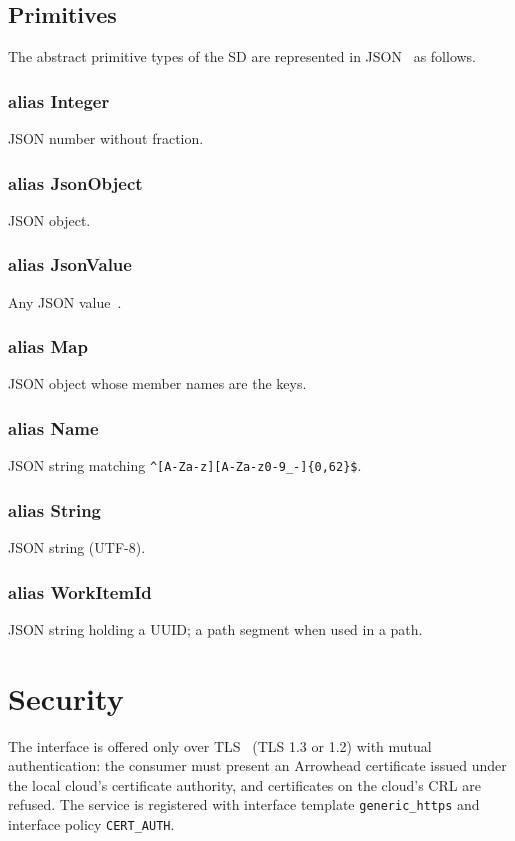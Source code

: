 \documentclass[a4paper]{arrowhead}
\newcommand{\pdef}[1]{{\textcolor{ArrowheadGrey}{#1\label{sec:model:primitives:#1}\label{sec:model:primitives:#1s}}}}
\begin{document}
\subsection{Primitives}
\label{sec:model:primitives}
The abstract primitive types of the SD are represented in JSON~\cite{rfc8259} as follows.
\subsubsection*{alias \pdef{Integer}}
JSON number without fraction.

\subsubsection*{alias \pdef{JsonObject}}
JSON object.

\subsubsection*{alias \pdef{JsonValue}}
Any JSON value~\cite{rfc8259}.

\subsubsection*{alias \pdef{Map}}
JSON object whose member names are the keys.

\subsubsection*{alias \pdef{Name}}
JSON string matching \texttt{\^{}[A-Za-z][A-Za-z0-9\_-]\{0,62\}\$}.

\subsubsection*{alias \pdef{String}}
JSON string (UTF-8).

\subsubsection*{alias \pdef{WorkItemId}}
JSON string holding a UUID; a path segment when used in a path.



\section{Security}
\label{sec:security}
The interface is offered only over TLS~\cite{rfc8446} (TLS 1.3 or 1.2) with mutual authentication: the consumer must
present an Arrowhead certificate issued under the local cloud's certificate authority, and certificates on the
cloud's CRL are refused. The service is registered with interface template \texttt{generic\_\allowbreak{}https} and interface
policy \texttt{CERT\_AUTH}.
\end{document}
